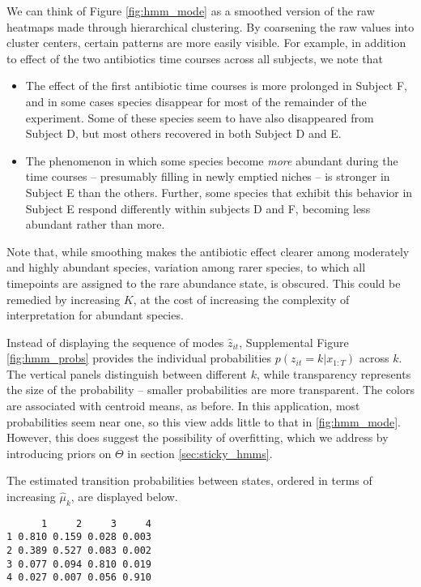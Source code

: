 \documentclass{article}
\begin{document}
We can think of Figure \ref{fig:hmm_mode} as a smoothed version of the raw
heatmaps made through hierarchical clustering. By coarsening the raw values into
cluster centers, certain patterns are more easily visible. For example, in
addition to effect of the two antibiotics time courses across all subjects, we
note that

\begin{itemize}
\item The effect of the first antibiotic time courses is more prolonged in
  Subject F, and in some cases species disappear for most of the remainder of
  the experiment. Some of these species seem to have also disappeared from
  Subject D, but most others recovered in both Subject D and E.
\item The phenomenon in which some species become \textit{more} abundant during
  the time courses -- presumably filling in newly emptied niches -- is stronger
  in Subject E than the others. Further, some species that exhibit this behavior
  in Subject E respond differently within subjects D and F, becoming less
  abundant rather than more.
\end{itemize}

Note that, while smoothing makes the antibiotic effect clearer among moderately
and highly abundant species, variation among rarer species, to which all
timepoints are assigned to the rare abundance state, is obscured. This could be
remedied by increasing $K$, at the cost of increasing the complexity of
interpretation for abundant species.

Instead of displaying the sequence of modes $\hat{z}_{it}$, Supplemental Figure
\ref{fig:hmm_probs} provides the individual probabilities $p\left(z_{it} = k
\vert x_{1:T}\right)$ across $k$. The vertical panels distinguish between
different $k$, while transparency represents the size of the probability --
smaller probabilities are more transparent. The colors are associated with
centroid means, as before. In this application, most probabilities seem near
one, so this view adds little to that in \ref{fig:hmm_mode}. However, this does
suggest the possibility of overfitting, which we address by introducing priors
on $\Theta$ in section \ref{sec:sticky_hmms}.

The estimated transition probabilities between states, ordered in terms of
increasing $\hat{\mu}_{k}$, are displayed below.
\begin{verbatim}
      1     2     3     4
1 0.810 0.159 0.028 0.003
2 0.389 0.527 0.083 0.002
3 0.077 0.094 0.810 0.019
4 0.027 0.007 0.056 0.910
\end{verbatim}
\end{document}
